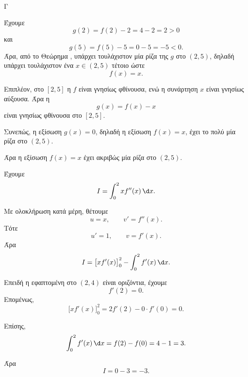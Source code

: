 \begin{thema}{Γ}
\begin{erwthma}
Έχουμε
\[
g(2)=f(2)-2=4-2=2>0
\]
και
\[
g(5)=f(5)-5=0-5=-5<0.
\]
Άρα, από το Θεώρημα , υπάρχει τουλάχιστον μία ρίζα της $g$ στο $(2,5)$, δηλαδή υπάρχει τουλάχιστον ένα $x\in(2,5)$ τέτοιο ώστε
\[
f(x)=x.
\]

Επιπλέον, στο $[2,5]$ η $f$ είναι γνησίως φθίνουσα, ενώ η συνάρτηση $x$ είναι γνησίως αύξουσα. Άρα η
\[
g(x)=f(x)-x
\]
είναι γνησίως φθίνουσα στο $[2,5]$.

Συνεπώς, η εξίσωση $g(x)=0$, δηλαδή η εξίσωση $f(x)=x$, έχει το πολύ μία ρίζα στο $(2,5)$.

Άρα η εξίσωση $f(x)=x$ έχει ακριβώς μία ρίζα στο $(2,5)$.

\item Έχουμε
\[
I=\int_0^2 x f''(x)\,\d x.
\]

Με ολοκλήρωση κατά μέρη, θέτουμε
\[
u=x,\qquad v'=f''(x).
\]
Τότε
\[
u'=1,\qquad v=f'(x).
\]
Άρα
\[
I=\bigl[x f'(x)\bigr]_0^2-\int_0^2 f'(x)\,\d x.
\]

Επειδή η εφαπτομένη στο $(2,4)$ είναι οριζόντια, έχουμε
\[
f'(2)=0.
\]
Επομένως,
\[
\bigl[x f'(x)\bigr]_0^2=2f'(2)-0\cdot f'(0)=0.
\]

Επίσης,
\[
\int_0^2 f'(x)\,\d x=f(2)-f(0)=4-1=3.
\]

Άρα
\[
I=0-3=-3.
\]
\end{erwthma}
\end{thema}




